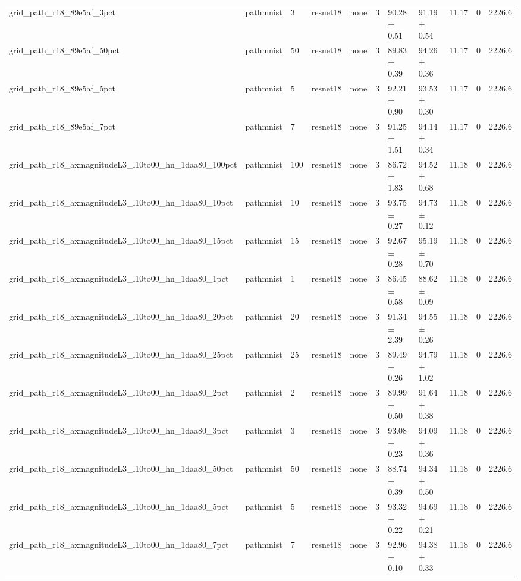 \begin{tabular}{lllllllllll}
grid_path_r18_89e5af_3pct & pathmnist & 3 & resnet18 & none & 3 & 90.28 $\pm$ 0.51 & 91.19 $\pm$ 0.54 & 11.17 & 0 & 2226.6 \\
grid_path_r18_89e5af_50pct & pathmnist & 50 & resnet18 & none & 3 & 89.83 $\pm$ 0.39 & 94.26 $\pm$ 0.36 & 11.17 & 0 & 2226.6 \\
grid_path_r18_89e5af_5pct & pathmnist & 5 & resnet18 & none & 3 & 92.21 $\pm$ 0.90 & 93.53 $\pm$ 0.30 & 11.17 & 0 & 2226.6 \\
grid_path_r18_89e5af_7pct & pathmnist & 7 & resnet18 & none & 3 & 91.25 $\pm$ 1.51 & 94.14 $\pm$ 0.34 & 11.17 & 0 & 2226.6 \\
grid_path_r18_axmagnitudeL3_l10to00_hn_1daa80_100pct & pathmnist & 100 & resnet18 & none & 3 & 86.72 $\pm$ 1.83 & 94.52 $\pm$ 0.68 & 11.18 & 0 & 2226.6 \\
grid_path_r18_axmagnitudeL3_l10to00_hn_1daa80_10pct & pathmnist & 10 & resnet18 & none & 3 & 93.75 $\pm$ 0.27 & 94.73 $\pm$ 0.12 & 11.18 & 0 & 2226.6 \\
grid_path_r18_axmagnitudeL3_l10to00_hn_1daa80_15pct & pathmnist & 15 & resnet18 & none & 3 & 92.67 $\pm$ 0.28 & 95.19 $\pm$ 0.70 & 11.18 & 0 & 2226.6 \\
grid_path_r18_axmagnitudeL3_l10to00_hn_1daa80_1pct & pathmnist & 1 & resnet18 & none & 3 & 86.45 $\pm$ 0.58 & 88.62 $\pm$ 0.09 & 11.18 & 0 & 2226.6 \\
grid_path_r18_axmagnitudeL3_l10to00_hn_1daa80_20pct & pathmnist & 20 & resnet18 & none & 3 & 91.34 $\pm$ 2.39 & 94.55 $\pm$ 0.26 & 11.18 & 0 & 2226.6 \\
grid_path_r18_axmagnitudeL3_l10to00_hn_1daa80_25pct & pathmnist & 25 & resnet18 & none & 3 & 89.49 $\pm$ 0.26 & 94.79 $\pm$ 1.02 & 11.18 & 0 & 2226.6 \\
grid_path_r18_axmagnitudeL3_l10to00_hn_1daa80_2pct & pathmnist & 2 & resnet18 & none & 3 & 89.99 $\pm$ 0.50 & 91.64 $\pm$ 0.38 & 11.18 & 0 & 2226.6 \\
grid_path_r18_axmagnitudeL3_l10to00_hn_1daa80_3pct & pathmnist & 3 & resnet18 & none & 3 & 93.08 $\pm$ 0.23 & 94.09 $\pm$ 0.36 & 11.18 & 0 & 2226.6 \\
grid_path_r18_axmagnitudeL3_l10to00_hn_1daa80_50pct & pathmnist & 50 & resnet18 & none & 3 & 88.74 $\pm$ 0.39 & 94.34 $\pm$ 0.50 & 11.18 & 0 & 2226.6 \\
grid_path_r18_axmagnitudeL3_l10to00_hn_1daa80_5pct & pathmnist & 5 & resnet18 & none & 3 & 93.32 $\pm$ 0.22 & 94.69 $\pm$ 0.21 & 11.18 & 0 & 2226.6 \\
grid_path_r18_axmagnitudeL3_l10to00_hn_1daa80_7pct & pathmnist & 7 & resnet18 & none & 3 & 92.96 $\pm$ 0.10 & 94.38 $\pm$ 0.33 & 11.18 & 0 & 2226.6 \\

\end{tabular}
